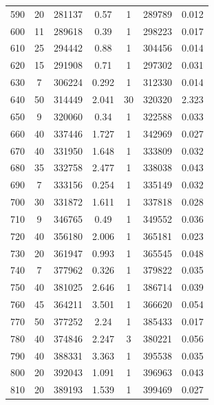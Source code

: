 \documentclass[a4paper,12pt]{article}
\begin{document}
\begin{center}
\begin{longtable}{|c|c|c|c|c|c|c|}
590   &   20   &   281137   &   0.57   &   1   &   289789   &   0.012  \\
600   &   11   &   289618   &   0.39   &   1   &   298223   &   0.017  \\
610   &   25   &   294442   &   0.88   &   1   &   304456   &   0.014  \\
620   &   15   &   291908   &   0.71   &   1   &   297302   &   0.031  \\
630   &   7   &   306224   &   0.292   &   1   &   312330   &   0.014  \\
640   &   50   &   314449   &   2.041   &   30   &   320320   &   2.323  \\
650   &   9   &   320060   &   0.34   &   1   &   322588   &   0.033  \\
660   &   40   &   337446   &   1.727   &   1   &   342969   &   0.027  \\
670   &   40   &   331950   &   1.648   &   1   &   333809   &   0.032  \\
680   &   35   &   332758   &   2.477   &   1   &   338038   &   0.043  \\
690   &   7   &   333156   &   0.254   &   1   &   335149   &   0.032  \\
700   &   30   &   331872   &   1.611   &   1   &   337818   &   0.028  \\
710   &   9   &   346765   &   0.49   &   1   &   349552   &   0.036  \\
720   &   40   &   356180   &   2.006   &   1   &   365181   &   0.023  \\
730   &   20   &   361947   &   0.993   &   1   &   365545   &   0.048  \\
740   &   7   &   377962   &   0.326   &   1   &   379822   &   0.035  \\
750   &   40   &   381025   &   2.646   &   1   &   386714   &   0.039  \\
760   &   45   &   364211   &   3.501   &   1   &   366620   &   0.054  \\
770   &   50   &   377252   &   2.24   &   1   &   385433   &   0.017  \\
780   &   40   &   374846   &   2.247   &   3   &   380221   &   0.056  \\
790   &   40   &   388331   &   3.363   &   1   &   395538   &   0.035  \\
800   &   20   &   392043   &   1.091   &   1   &   396963   &   0.043  \\
810   &   20   &   389193   &   1.539   &   1   &   399469   &   0.027  \\

\end{longtable}
\end{center}
\end{document}
